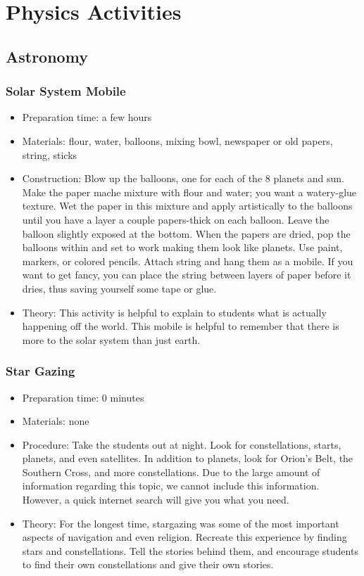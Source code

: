 \chapter{Physics Activities}

\section{Astronomy}

\subsection{Solar System Mobile}
\begin{itemize}
\item{Preparation time: a few hours}
\item{Materials: flour, water, balloons, mixing bowl, newspaper or old papers, string, sticks}
\item{Construction: Blow up the balloons, one for each of the 8 planets and sun. Make the paper mache mixture with flour and water; you want a watery-glue texture. Wet the paper in this mixture and apply artistically to the balloons until you have a layer a couple papers-thick on each balloon. Leave the balloon slightly exposed at the bottom. When the papers are dried, pop the balloons within and set to work making them look like planets. Use paint, markers, or colored pencils. Attach string and hang them as a mobile. If you want to get fancy, you can place the string between layers of paper before it dries, thus saving yourself some tape or glue.}
\item{Theory: This activity is helpful to explain to students what is actually happening off the world. This mobile is helpful to remember that there is more to the solar system than just earth.}
\end{itemize}

\subsection{Star Gazing}
\begin{itemize}
\item{Preparation time: 0 minutes}
\item{Materials: none}
\item{Procedure: Take the students out at night. Look for constellations, starts, planets, and even satellites. In addition to planets, look for Orion’s Belt, the Southern Cross, and more constellations. Due to the large amount of information regarding this topic, we cannot include this information. However, a quick internet search will give you what you need.}
\item{Theory: For the longest time, stargazing was some of the most important aspects of navigation and even religion. Recreate this experience by finding stars and constellations. Tell the stories behind them, and encourage students to find their own constellations and give their own stories.}
\end{itemize}

